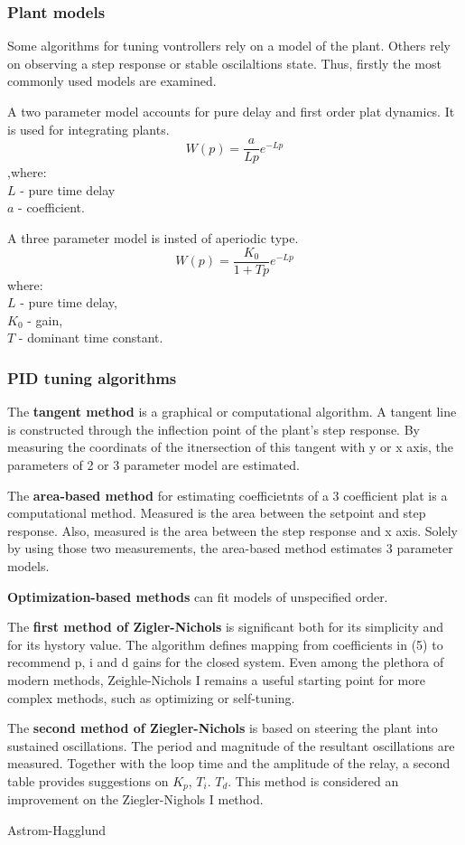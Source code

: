 \subsubsection{Plant models}
Some algorithms for tuning vontrollers rely on a model of the plant.
Others rely on observing a step response or stable oscilaltions state.
Thus, firstly the most commonly used models are examined.
\par
A two parameter model accounts for pure delay and first order plat dynamics.
It is used for integrating plants.
\begin{equation}
    W(p) = \frac{a}{L p} e^{- L p}
\end{equation}
,where:  \\
$L$ - pure time delay \\
$a$ - coefficient.
\par
A three parameter model is insted of aperiodic type.
\begin{equation}
    W(p) = \frac{K_0}{1 + T p} e^{-Lp}
\end{equation}
where:  \\
$L$ - pure time delay,  \\
$K_0$ - gain,  \\
$T$ - dominant time constant.

\subsubsection{PID tuning algorithms}
The \textbf{tangent method} is a graphical or computational algorithm.
A tangent line is constructed through the inflection point of the plant's step response.
By measuring the coordinats of the itnersection of this tangent with y or x axis,
the parameters of 2 or 3 parameter model are estimated.
\par
The \textbf{area-based method} for estimating coefficietnts of a 3 coefficient plat is a computational method.
Measured is the area between the setpoint and step response.
Also, measured is the area between the step response and x axis.
Solely by using those two measurements, the area-based method estimates 3 parameter models.
\par
\textbf{Optimization-based methods} can fit models of unspecified order.
\par
The \textbf{first method of Zigler-Nichols} is significant both for its simplicity and for its hystory value.
The algorithm defines mapping from coefficients in (5) to recommend p, i and d gains for the closed system.
Even among the plethora of modern methods, Zeighle-Nichols I remains a useful starting point for more complex methods, such as optimizing or self-tuning.
\par
The \textbf{second method of Ziegler-Nichols} is based on steering the plant into sustained oscillations.
The period and magnitude of the resultant oscillations are measured.
Together with the loop time and the amplitude of the relay, a second table provides suggestions on $K_p$, $T_i$. $T_d$.
This method is considered an improvement on the Ziegler-Nighols I method.
\par
Astrom-Hagglund


